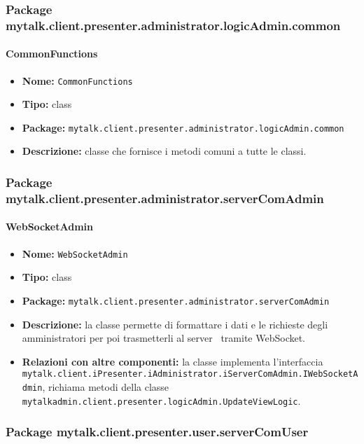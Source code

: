 \subsubsection{Package mytalk.client.presenter.administrator.logicAdmin.common}
\paragraph{CommonFunctions}{
	\begin{itemize}
		\item [] \textbf{Nome:} \texttt{CommonFunctions}
		\item [] \textbf{Tipo:} class
		\item [] \textbf{Package:} \texttt{mytalk.client.presenter.administrator.logicAdmin.common}
		\item [] \textbf{Descrizione:}{ classe che fornisce i metodi comuni a tutte le classi.}
	\end{itemize}
}


\subsubsection{Package mytalk.client.presenter.administrator.serverComAdmin}
\paragraph{WebSocketAdmin}{
	\begin{itemize}
		\item [] \textbf{Nome:} \texttt{WebSocketAdmin}
		\item [] \textbf{Tipo:} class
		\item [] \textbf{Package:} \texttt{mytalk.client.presenter.administrator.serverComAdmin}
		\item [] \textbf{Descrizione:}{ la classe permette di formattare i dati e le richieste degli amministratori per poi trasmetterli al server\g~ tramite WebSocket\g.}
		\item [] \textbf{Relazioni con altre componenti: } la classe implementa l'interfaccia\\ \texttt{mytalk.client.iPresenter.iAdministrator.iServerComAdmin.IWebSocketAdmin}, richiama metodi della classe\\ \texttt{mytalkadmin.client.presenter.logicAdmin.UpdateViewLogic}.
	\end{itemize}
}

\subsubsection{Package mytalk.client.presenter.user.serverComUser}


